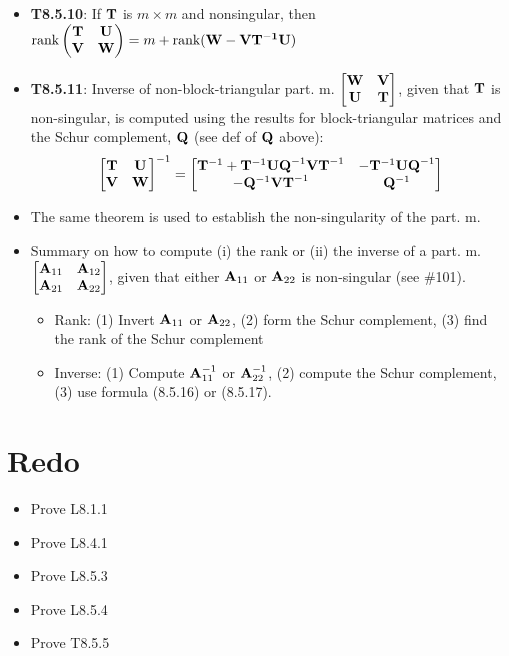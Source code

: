 \documentclass[a4paper, oneside]{book}
\begin{document}
\begin{itemize}
\begin{itemize}
	\end{itemize}
\item \textbf{T8.5.10}: If $\mathbf T$ is $m\times m$ and nonsingular, then $\text{rank}\left(\begin{matrix}
	\mathbf T & \mathbf U \\ \mathbf V & \mathbf W
	\end{matrix}\right) = m + \text{rank}(\mathbf{W-VT^{-1}U})$
\item \textbf{T8.5.11}: Inverse of non-block-triangular part. m. $\begin{bmatrix}
\mathbf W & \mathbf V \\ \mathbf U & \mathbf T
\end{bmatrix}$, given that $\mathbf T$ is non-singular, is computed using the results for block-triangular matrices and the Schur complement, $\mathbf{Q}$ (see def of $\mathbf{Q}$ above):
	\begin{equation}
	\begin{bmatrix}
	\mathbf{T} &  \mathbf{U} \\
	\mathbf{V} & \mathbf{W}
	\end{bmatrix}^{-1} = 
	\begin{bmatrix}
	\mathbf{T}^{-1} + \mathbf{T}^{-1}\mathbf{UQ}^{-1}\mathbf{VT}^{-1} & -\mathbf{T}^{-1}\mathbf{UQ}^{-1} \\
	-\mathbf{Q}^{-1}\mathbf{VT}^{-1} 	&  	\mathbf{Q}^{-1}
	\end{bmatrix}
	\end{equation}
\item The same theorem is used to establish the non-singularity of the part. m.
\item Summary on how to compute (i) the rank or (ii) the inverse of a part. m. $\begin{bmatrix}
\mathbf{A}_{11} & \mathbf{A}_{12} \\ \mathbf{A}_{21} & \mathbf{A}_{22}
\end{bmatrix}$, given that either $\mathbf{A}_{11}$ or $\mathbf{A}_{22}$ is non-singular (see \#101).
	\begin{itemize}
	\item Rank: (1) Invert $\mathbf{A}_{11}$ or $\mathbf{A}_{22}$, (2) form the Schur complement, (3) find the rank of the Schur complement
	\item Inverse: (1) Compute $\mathbf{A}^{-1}_{11}$ or $\mathbf{A}^{-1}_{22}$, (2) compute the Schur complement, (3) use formula (8.5.16) or (8.5.17).
	\end{itemize}
\end{itemize}

\section*{Redo}
\begin{itemize}
\item Prove L8.1.1
\item Prove L8.4.1
\item Prove L8.5.3
\item Prove L8.5.4
\item Prove T8.5.5
\end{itemize}
\end{document}
